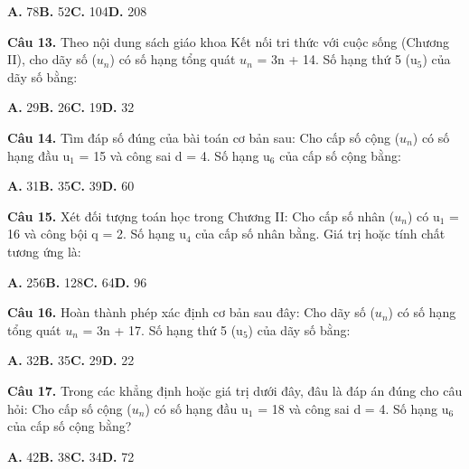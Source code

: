\documentclass[11pt,a4paper]{article}
\begin{document}
\hspace*{1.5em}\textbf{A.} 78\quad\quad \textbf{B.} 52\quad\quad \textbf{C.} 104\quad\quad \textbf{D.} 208\par\vspace{2pt}
\textbf{\color{primary} Câu 13.} Theo nội dung sách giáo khoa Kết nối tri thức với cuộc sống (Chương II), cho dãy số ($u_n$) có số hạng tổng quát $u_n$ = 3n + 14. Số hạng thứ 5 (u$_5$) của dãy số bằng:\par
\hspace*{1.5em}\textbf{A.} 29\quad\quad \textbf{B.} 26\quad\quad \textbf{C.} 19\quad\quad \textbf{D.} 32\par\vspace{2pt}
\textbf{\color{primary} Câu 14.} Tìm đáp số đúng của bài toán cơ bản sau: Cho cấp số cộng ($u_n$) có số hạng đầu u$_1$ = 15 và công sai d = 4. Số hạng u$_6$ của cấp số cộng bằng:\par
\hspace*{1.5em}\textbf{A.} 31\quad\quad \textbf{B.} 35\quad\quad \textbf{C.} 39\quad\quad \textbf{D.} 60\par\vspace{2pt}
\textbf{\color{primary} Câu 15.} Xét đối tượng toán học trong Chương II: Cho cấp số nhân ($u_n$) có u$_1$ = 16 và công bội q = 2. Số hạng u$_4$ của cấp số nhân bằng. Giá trị hoặc tính chất tương ứng là:\par
\hspace*{1.5em}\textbf{A.} 256\quad\quad \textbf{B.} 128\quad\quad \textbf{C.} 64\quad\quad \textbf{D.} 96\par\vspace{2pt}
\textbf{\color{primary} Câu 16.} Hoàn thành phép xác định cơ bản sau đây: Cho dãy số ($u_n$) có số hạng tổng quát $u_n$ = 3n + 17. Số hạng thứ 5 (u$_5$) của dãy số bằng:\par
\hspace*{1.5em}\textbf{A.} 32\quad\quad \textbf{B.} 35\quad\quad \textbf{C.} 29\quad\quad \textbf{D.} 22\par\vspace{2pt}
\textbf{\color{primary} Câu 17.} Trong các khẳng định hoặc giá trị dưới đây, đâu là đáp án đúng cho câu hỏi: Cho cấp số cộng ($u_n$) có số hạng đầu u$_1$ = 18 và công sai d = 4. Số hạng u$_6$ của cấp số cộng bằng?\par
\hspace*{1.5em}\textbf{A.} 42\quad\quad \textbf{B.} 38\quad\quad \textbf{C.} 34\quad\quad \textbf{D.} 72\par\vspace{2pt}
\end{document}
